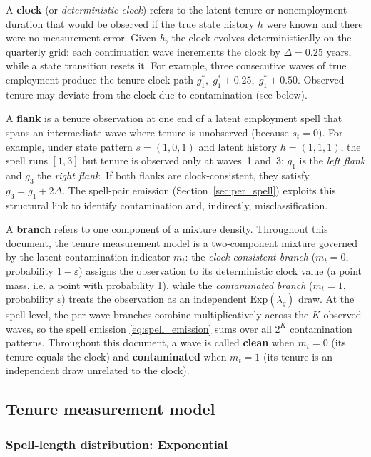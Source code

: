 A \textbf{clock} (or \emph{deterministic clock}) refers to the
latent tenure or nonemployment duration that would be observed if the
true state history \(h\) were known and there were no measurement error.
Given \(h\), the clock evolves deterministically on the quarterly grid:
each continuation wave increments the clock by \(\Delta = 0.25\) years,
while a state transition resets it. For example, three consecutive waves
of true employment produce the tenure clock path
\(g^*_1, \; g^*_1 + 0.25, \; g^*_1 + 0.50\). Observed tenure may
deviate from the clock due to contamination (see below).

A \textbf{flank} is a tenure observation at one end of a latent
employment spell that spans an intermediate wave where tenure is
unobserved (because \(s_t = 0\)). For example, under state pattern
\(s = (1,0,1)\) and latent history \(h = (1,1,1)\), the spell runs
\([1,3]\) but tenure is observed only at waves~1 and~3; \(g_1\) is the
\emph{left flank} and \(g_3\) the \emph{right flank}. If both flanks
are clock-consistent, they satisfy \(g_3 = g_1 + 2\Delta\). The
spell-pair emission (Section~\ref{sec:per_spell}) exploits this
structural link to identify contamination and, indirectly,
misclassification.

A \textbf{branch} refers to one component of a mixture density.
Throughout this document, the tenure measurement model is a two-component
mixture governed by the latent contamination indicator \(m_{t}\):
the \emph{clock-consistent branch} (\(m_{t}=0\), probability
\(1-\varepsilon\)) assigns the observation to its deterministic clock
value (a point mass, i.e. a point with probability 1), while the \emph{contaminated branch}
(\(m_{t}=1\), probability \(\varepsilon\)) treats the observation as an
independent \(\mathrm{Exp}(\lambda_g)\) draw. At the spell level, the
per-wave branches combine multiplicatively across the \(K\) observed waves,
so the spell emission \eqref{eq:spell_emission} sums over all \(2^K\)
contamination patterns. Throughout this document, a wave is called
\textbf{clean} when \(m_t = 0\) (its tenure equals the clock) and
\textbf{contaminated} when \(m_t = 1\) (its tenure is an independent draw
unrelated to the clock).

\subsection{Tenure measurement model}

\subsubsection{Spell-length distribution: Exponential}

